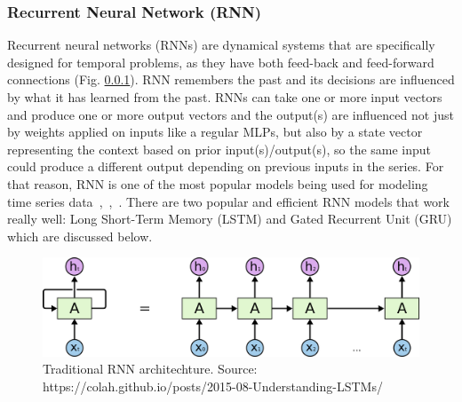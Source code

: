 \documentclass[a4paper,13pt,2p]{report}
\begin{document}
\subsubsection{Recurrent Neural Network (RNN)}
\label{model_rnn}
	Recurrent neural networks (RNNs) are dynamical systems that are specifically designed for temporal problems, as they have both feed-back and feed-forward connections (Fig. \ref{model_rnn}). RNN remembers the past and  its decisions are influenced by what it has learned from the past. RNNs can take one or more input vectors and produce one or more output vectors and the output(s) are influenced not just by weights applied on inputs like a regular MLPs, but also by a state vector representing the context based on prior input(s)/output(s),  so the same input could produce a different output depending on previous inputs in the series. For that reason, RNN is one of the most popular models being used for modeling time series data~\cite{zhang2000predicting},~\cite{connor1994recurrent},~\cite{chandra2012cooperative}. There are two popular and efficient RNN models that work really well: Long Short-Term Memory (LSTM) and Gated Recurrent Unit (GRU) which are discussed below. 
\begin{figure}[!ht] 
   \centering
   \includegraphics[width=1.0\linewidth]{png/rnn_unrolled}
  \caption{Traditional RNN architechture. Source: https://colah.github.io/posts/2015-08-Understanding-LSTMs/} 
  \label{model_lstm_gru} 
\end{figure}
\end{document}
